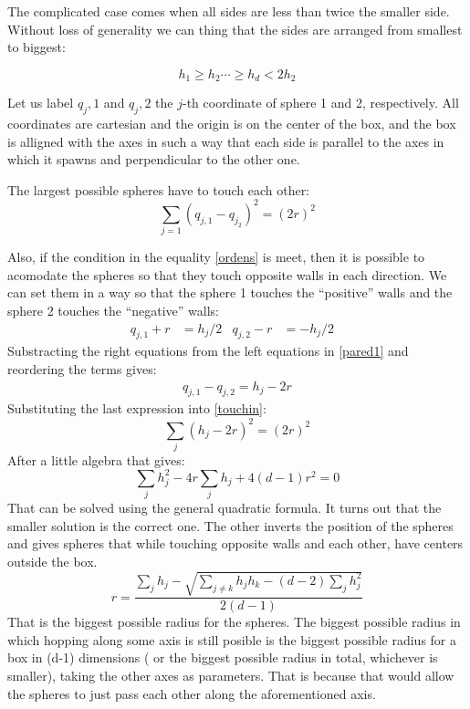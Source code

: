 \documentclass[superscriptaddress,pre,reprint,showpacs,onecolumn]{revtex4-1}
\begin{document}
The complicated case comes when all sides are less than twice
the smaller side. Without loss of generality we can thing that the sides
are arranged from smallest to biggest:

\begin{equation}\label{ordens}
  h_1 \geq h_2 \cdots \geq h_d < 2 h_2
\end{equation}

Let us label $q_j,1$ and $q_j,2$ the $j$-th coordinate of sphere 1 and 2,
respectively. All coordinates are cartesian and the origin is on the
center of the box, and the box is alligned with the axes in such a way
that each side is parallel to the axes in which it spawns and perpendicular
to the other one. 

The largest possible spheres have to touch each other:
\begin{equation}\label{touchin}
  \sum_{j=1}(q_{j,1}-q_{j_2})^2=(2 r)^2
\end{equation}

Also, if the condition in the equality \ref{ordens} is meet, then
it is possible to acomodate the spheres so that they touch opposite walls in
each direction. We can set them in a way so that the sphere 1 touches the
``positive'' walls and the sphere 2 touches the ``negative'' walls:
\begin{align}\label{pared1}
  q_{j,1}+r & =h_j/2 & q_{j,2}-r & =-h_j/2 &
\end{align}
Substracting the right equations from the left equations in \ref{pared1}
and reordering the terms gives:
\begin{align}
  q_{j,1}-q_{j,2}=h_j-2r
\end{align}
Substituting the last expression into \ref{touchin}:
\begin{equation}
  \sum_j(h_j-2r)^2=(2r)^2
\end{equation}
After a little algebra that gives:
\begin{equation}
  \sum_j h_j^2 -4r\sum_j h_j + 4(d-1)r^2=0
\end{equation}
That can be solved using the general quadratic formula.
It turns out that the smaller solution is the correct one. The other
inverts the position of the spheres and gives spheres that while
touching opposite walls and each other, have centers outside the box.
\begin{equation}\label{rmax}
  r=\frac{\sum_j h_j - \sqrt{\sum_{j\neq k}h_j h_k-(d-2)\sum_j{h_j^2}}}{2(d-1)}
\end{equation}
That is the biggest possible radius for the spheres.
The biggest possible radius in which hopping along some axis is still
posible is the biggest possible radius for a box in (d-1) dimensions
( or the biggest possible radius in total, whichever is smaller),
taking the other axes as parameters. That is because that would allow
the spheres to just pass each other along the aforementioned axis.
\end{document}
